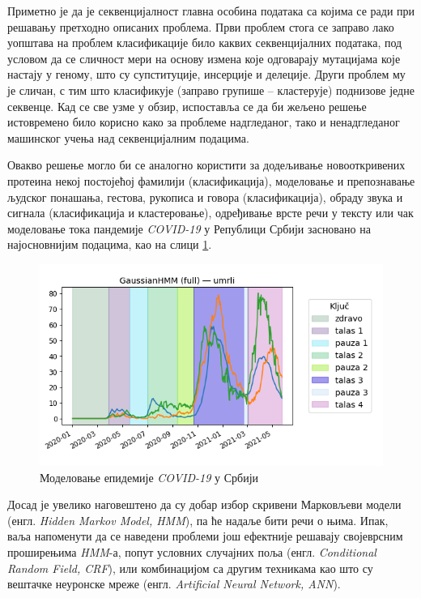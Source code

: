 \documentclass[12pt,oneside]{memoir}
\begin{document}
\begin{CJK}{UTF8}{ipxm}
Приметно је да је секвенцијалност главна особина података са којима се ради при решавању претходно описаних проблема. Први проблем стога се заправо лако уопштава на проблем класификације било каквих секвенцијалних података, под условом да се сличност мери на основу измена које одговарају мутацијама које настају у геному, што су супституције, инсерције и делеције. Други проблем му је сличан, с тим што класификује (заправо групише -- кластерује) поднизове једне секвенце. Кад се све узме у обзир, испоставља се да би жељено решење истовремено било корисно како за проблеме надгледаног, тако и ненадгледаног машинског учења над секвенцијалним подацима\cite{khoda2014}.

Овакво решење могло би се аналогно користити за додељивање новооткривених протеина некој постојећој фамилији\cite{nguyen2016} (класификација), моделовање и препознавање људског понашања, гестова, рукописа и говора\cite{gales2007} (класификација), обраду звука и сигнала\cite{andreao2006} (класификација и кластеровање), одређивање врсте речи у тексту\cite{mutjaba2020} или чак моделовање тока пандемије \textit{COVID-19} у Републици Србији засновано на најосновнијим подацима, као на слици \ref{fig:covid}.

\begin{figure}[H]
  \centering
  \includegraphics[width=.8\textwidth]{covid.png}
  \caption{Моделовање епидемије \textit{COVID-19} у Србији\cite{vasovic2021}}
  \label{fig:covid}
\end{figure}

Досад је увелико наговештено да су добар избор скривени Марковљеви модели (енгл. \textit{Hidden Markov Model, HMM}), па ће надаље бити речи о њима. Ипак, ваља напоменути да се наведени проблеми још ефектније решавају својеврсним проширењима \textit{HMM}-а, попут условних случајних поља\cite{ponomareva2007} (енгл. \textit{Conditional Random Field, CRF}), или комбинацијом са другим техникама као што су вештачке неуронске мреже\cite{cohen1999} (енгл. \textit{Artificial Neural Network, ANN}).


\end{CJK}
\end{document}
